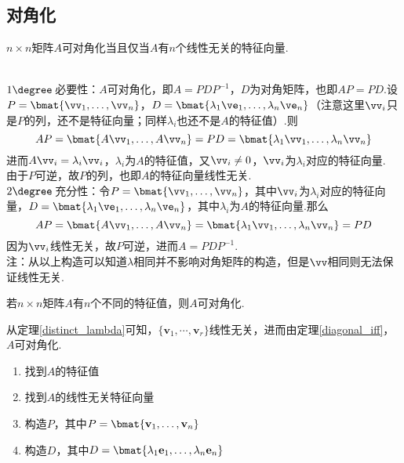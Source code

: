 \subsection{对角化}
\begin{theorem}
\label{diagonal_iff}
$n\times n$矩阵$A$可对角化当且仅当$A$有$n$个线性无关的特征向量.
\end{theorem}
\begin{analysis}\mbox{}\\
$1\degree\,$必要性：$A$可对角化，即$A=PDP^{-1}$，$D$为对角矩阵，也即$AP=PD$.设$P=\bmat{\vv_1,\ldots,\vv_n}$，$D=\bmat{\lambda_1\ve_1,\ldots,\lambda_n\ve_n}$（注意这里$\vv_i$只是$P$的列，还不是特征向量；同样$\lambda_i$也还不是$A$的特征值）.则
\[AP=\bmat{A\vv_1,\ldots,A\vv_n}=PD=\bmat{\lambda_1\vv_1,\ldots,\lambda_n\vv_n}\]
进而$A\vv_i=\lambda_i\vv_i$，$\lambda_i$为$A$的特征值，又$\vv_i\ne 0$，$\vv_i$为$\lambda_i$对应的特征向量.\\
由于$P$可逆，故$P$的列，也即$A$的特征向量线性无关.\\
$2\degree\,$充分性：令$P=\bmat{\vv_1,\ldots,\vv_n}$，其中$\vv_i$为$\lambda_i$对应的特征向量，$D=\bmat{\lambda_1\ve_1,\ldots,\lambda_n\ve_n}$，其中$\lambda_i$为$A$的特征向量.那么\\
\[AP=\bmat{A\vv_1,\ldots,A\vv_n}=\bmat{\lambda_1\vv_1,\ldots,\lambda_n\vv_n}=PD\]
因为$\vv_i$线性无关，故$P$可逆，进而$A=PDP^{-1}$.\\
注：从以上构造可以知道$\lambda$相同并不影响对角矩阵的构造，但是$\vv$相同则无法保证线性无关.
\end{analysis}
\begin{theorem}
若$n\times n$矩阵$A$有$n$个不同的特征值，则$A$可对角化.
\end{theorem}
\begin{analysis}
从定理\ref{distinct_lambda}可知，$\{\mathbf{v}_1,\cdots,\mathbf{v}_r\}$线性无关，进而由定理\ref{diagonal_iff}，$A$可对角化.
\end{analysis}
\begin{myalgorithm}[对角化]\mbox{}\par
\begin{enumerate}
	\itemsep -3pt
	\item 找到$A$的特征值
	\item 找到$A$的线性无关特征向量
	\item 构造$P$，其中$P=\bmat{\mathbf{v}_1,\ldots,\mathbf{v}_n}$
	\item 构造$D$，其中$D=\bmat{\lambda_1\mathbf{e}_1,\ldots,\lambda_n\mathbf{e}_n}$
\end{enumerate}
\end{myalgorithm}
